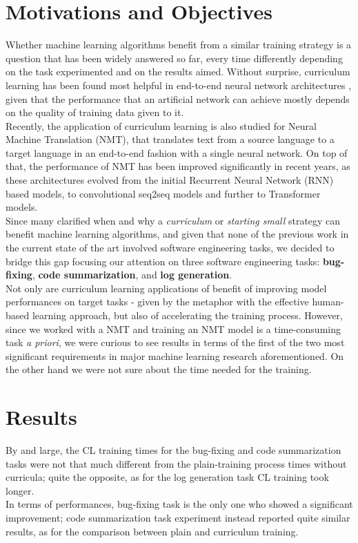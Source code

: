 \section{Motivations and Objectives}
Whether machine learning algorithms benefit from a similar training strategy is a question that has been widely answered so far, 
every time differently depending on the task experimented and on the results aimed. Without surprise, curriculum learning 
has been found most helpful in end-to-end neural network architectures \cite{bengio2009curriculum},
given that the performance that an artificial network can achieve mostly depends on the quality of training data given to it.\\
Recently, the application of curriculum learning is also studied for Neural Machine Translation (NMT), that translates text from a source
language to a target language in an end-to-end fashion with a single neural network. On top of that, the performance of 
NMT has been improved significantly in recent years, as these architectures evolved from the initial Recurrent Neural Network (RNN) based models, to convolutional
seq2seq models and further to Transformer models. \\

Since many clarified when and why a \textit{curriculum} or \textit{starting small} strategy can benefit
machine learning algorithms, and given that none of the previous work in the current state of the art 
involved software engineering tasks, we decided to bridge this gap focusing our attention on three software engineering tasks: \textbf{bug-fixing}, 
\textbf{code summarization}, and \textbf{log generation}.\\

Not only are curriculum learning applications of benefit of improving model performances
on target tasks - given by the metaphor with 
the effective human-based learning approach, but also of accelerating the training process.
However, since we worked with a NMT and training an NMT model is a time-consuming task \textit{a priori}, 
we were curious to see results in terms of the first of the two most significant requirements 
in major machine learning research aforementioned. On the other hand we were not sure about the time needed for the training.

\section{Results}
By and large, the CL training times for the bug-fixing 
and code summarization tasks were not that much different from
the plain-training process times without curricula; quite the opposite, as for the log generation task CL training took longer.\\
In terms of performances, bug-fixing task is the only one who showed a significant improvement; code summarization task experiment
instead reported quite similar results, as for the comparison between plain and curriculum training.

